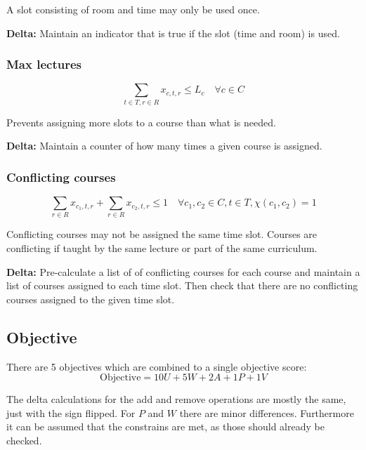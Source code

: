 A slot consisting of room and time may only be used once.

\textbf{Delta:} Maintain an indicator that is true if the slot (time and room) is used.

\subsubsection{Max lectures}
\begin{equation}
\sum_{t \in T, r \in R} x_{c, t, r} \le L_c \quad \forall c \in C
\end{equation}

Prevents assigning more slots to a course than what is needed.

\textbf{Delta: } Maintain a counter of how many times a given course is assigned.

\subsubsection{Conflicting courses}
\begin{equation}
\sum_{r \in R} x_{c_1, t, r} + \sum_{r \in R} x_{c_2, t, r} \le 1 \quad \forall c_1, c_2 \in C, t \in T, \chi(c_1, c_2) = 1
\end{equation}

Conflicting courses may not be assigned the same time slot. Courses are conflicting if taught by the same lecture or part of the same curriculum.

\textbf{Delta: } Pre-calculate a list of of conflicting courses for each course and maintain a list of courses assigned to each time slot. Then check that there are no conflicting courses assigned to the given time slot.

\subsection{Objective}
\label{sec:problem-objective}

There are 5 objectives which are combined to a single objective score:
\begin{equation}
\mathrm{Objective} = 10 U + 5 W + 2 A + 1 P + 1 V
\end{equation}

The delta calculations for the add and remove operations are mostly the same, just with the sign flipped. For $P$ and $W$ there are minor differences. Furthermore it can be assumed that the constrains are met, as those should already be checked.

